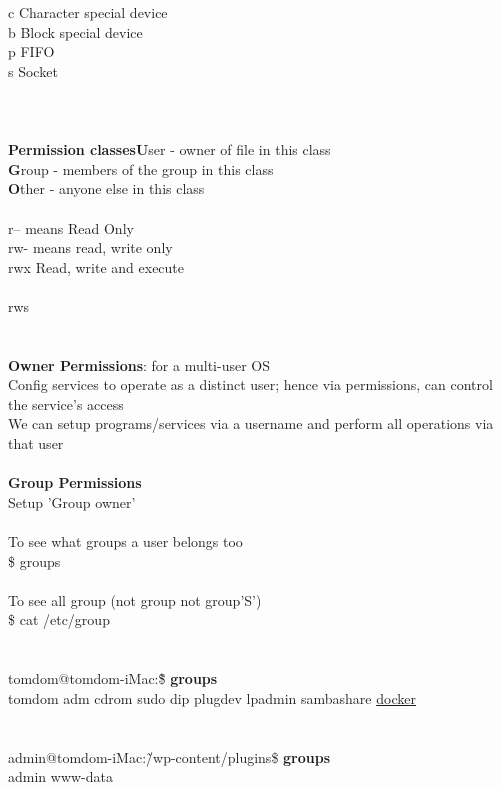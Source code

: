 \documentclass[10pt,a4paper]{article}
\begin{document}
{{{{{{{{{{{{{{{{{{{{c	Character special device\\
b	Block special device\\
p	FIFO\\
s	Socket\\
\\
\\
\\
\textbf{Permission classes}}{\large \textbf{U}}{\large ser - owner of file in this class\\
\textbf{G}}{\large roup - members of the group in this class\\
\textbf{O}}{\large ther -  anyone else in this class\\
\\
r--  means Read Only\\
rw- means read, write only\\
rwx Read, write and execute\\
\\
rws \\
\\
\\
\textbf{Owner Permissions}}{\large : for a multi-user OS\\
Config services to operate as a distinct user; hence via permissions, can control the service's access\\
We can setup programs/services via a username and perform all operations via that user\\
\\
\textbf{Group Permissions}}{\large \\
Setup 'Group owner'\\
\\
To see what groups a user belongs too \\
\$ groups\\
\\
To see all group  (not group not group'S')\\
\$ cat /etc/group}{\large \\
\\
\\
tomdom@tomdom-iMac:\~\$ \textbf{groups}}{\large \\
tomdom adm cdrom sudo dip plugdev lpadmin sambashare \hyperlink{docker}{docker}}{\large \\
\\
\\
admin@tomdom-iMac:\~/wp-content/plugins\$ \textbf{groups}}{\large \\
admin www-data\\
}}}}}}}}}}}}}}}}}}}}
\end{document}
